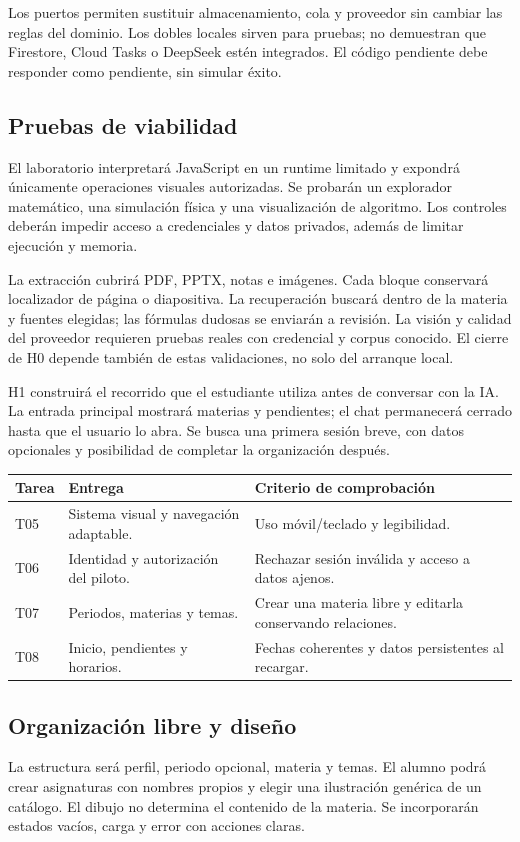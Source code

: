 Los puertos permiten sustituir almacenamiento, cola y proveedor sin cambiar las reglas del dominio. Los dobles locales sirven para pruebas; no demuestran que Firestore, Cloud Tasks o DeepSeek estén integrados. El código pendiente debe responder como pendiente, sin simular éxito.

\subsection*{Pruebas de viabilidad}
El laboratorio interpretará JavaScript en un runtime limitado y expondrá únicamente operaciones visuales autorizadas. Se probarán un explorador matemático, una simulación física y una visualización de algoritmo. Los controles deberán impedir acceso a credenciales y datos privados, además de limitar ejecución y memoria.

La extracción cubrirá PDF, PPTX, notas e imágenes. Cada bloque conservará localizador de página o diapositiva. La recuperación buscará dentro de la materia y fuentes elegidas; las fórmulas dudosas se enviarán a revisión. La visión y calidad del proveedor requieren pruebas reales con credencial y corpus conocido. El cierre de H0 depende también de estas validaciones, no solo del arranque local.

H1 construirá el recorrido que el estudiante utiliza antes de conversar con la IA. La entrada principal mostrará materias y pendientes; el chat permanecerá cerrado hasta que el usuario lo abra. Se busca una primera sesión breve, con datos opcionales y posibilidad de completar la organización después.

\begin{tabularx}{\linewidth}{P{1.2cm}Y Y}
\toprule
\textbf{Tarea} & \textbf{Entrega} & \textbf{Criterio de comprobación}\\
\midrule
T05 & Sistema visual y navegación adaptable. & Uso móvil/teclado y legibilidad.\\
T06 & Identidad y autorización del piloto. & Rechazar sesión inválida y acceso a datos ajenos.\\
T07 & Periodos, materias y temas. & Crear una materia libre y editarla conservando relaciones.\\
T08 & Inicio, pendientes y horarios. & Fechas coherentes y datos persistentes al recargar.\\
\bottomrule
\end{tabularx}

\subsection*{Organización libre y diseño}
La estructura será perfil, periodo opcional, materia y temas. El alumno podrá crear asignaturas con nombres propios y elegir una ilustración genérica de un catálogo. El dibujo no determina el contenido de la materia. Se incorporarán estados vacíos, carga y error con acciones claras.

